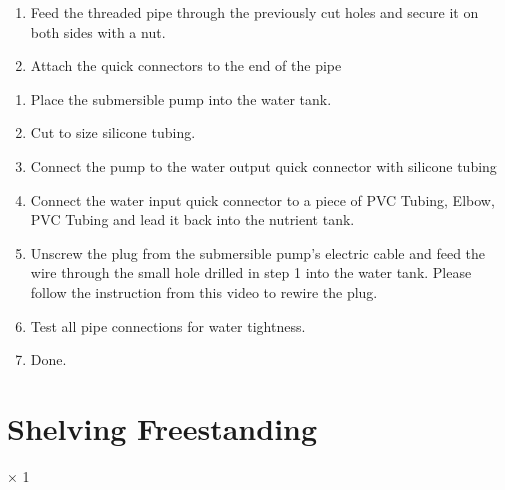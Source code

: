 \documentclass[letterpaper,10pt,english]{sphinxmanual}
\begin{document}
\noindent{}

\noindent{}
\begin{enumerate}
%
\setcounter{enumi}{2}
\item {} 
Feed the threaded pipe through the previously cut holes and secure it on both sides with a nut.

\item {} 
Attach the quick connectors to the end of the pipe

\end{enumerate}

\noindent{}

\noindent{}
\begin{enumerate}
%
\setcounter{enumi}{4}
\item {} 
Place the submersible pump into the water tank.

\item {} 
Cut to size silicone tubing.

\item {} 
Connect the pump to the water output quick connector with silicone tubing

\item {} 
Connect the water input quick connector to a piece of PVC Tubing, Elbow, PVC Tubing and lead it back into the nutrient tank.

\item {} 
Unscrew the plug from the submersible pump’s electric cable and feed the wire through the small hole drilled in step 1 into the water tank. Please follow the instruction from this video to rewire the plug. 

\item {} 
Test all pipe connections for water tightness.

\item {} 
Done.

\end{enumerate}


\section{Shelving \sphinxhyphen{} Freestanding}
\label{\detokenize{shelving_freestanding:shelving-freestanding}}\label{\detokenize{shelving_freestanding::doc}}
× 1
\end{document}
